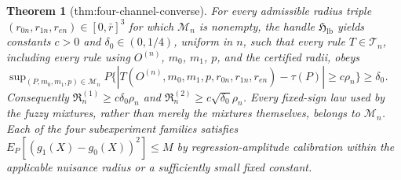 \documentclass{article}
\newtheorem{theorem}{Theorem}
\begin{document}
\begin{theorem}[thm:four-channel-converse]\label{thm:four-channel-converse}
For every admissible radius triple \( (r_{0n},r_{1n},r_{en})\in[0,\bar r]^3 \) for which \(\mathcal M_n\) is nonempty, the handle \(\mathfrak H_{\mathrm{lb}}\) yields constants \(c>0\) and \(\delta_0\in(0,1/4)\), uniform in \(n\), such that every rule \(T\in\mathcal T_n\), including every rule using \(O^{(n)}\), \(m_0\), \(m_1\), \(p\), and the certified radii, obeys \(\sup_{(P,m_0,m_1,p)\in\mathcal M_n}P\{|T(O^{(n)},m_0,m_1,p,r_{0n},r_{1n},r_{en})-\tau(P)|\ge c\rho_n\}\ge\delta_0\). Consequently \(\mathfrak R_n^{(1)}\ge c\delta_0\rho_n\) and \(\mathfrak R_n^{(2)}\ge c\sqrt{\delta_0}\rho_n\). Every fixed-sign law used by the fuzzy mixtures, rather than merely the mixtures themselves, belongs to \(\mathcal M_n\). Each of the four subexperiment families satisfies \(E_P[(g_1(X)-g_0(X))^2]\le M\) by regression-amplitude calibration within the applicable nuisance radius or a sufficiently small fixed constant.
\end{theorem}
\end{document}
